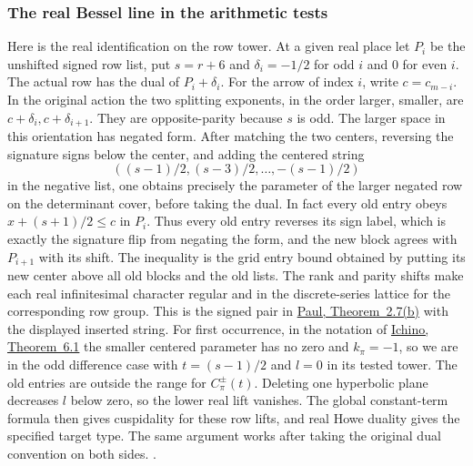 \subsubsection{The real Bessel line in the arithmetic tests}
Here is the real identification on the row tower. At a given
real place let \(P_i\) be the unshifted signed row list, put
\(s=r+6\) and
\(\delta_i=-1/2\) for odd \(i\) and \(0\) for even \(i\).
The actual row has the dual of \(P_i+\delta_i\).
For the arrow of index \(i\), write \(c=c_{m-i}\).
In the original action the two splitting exponents, in the
order larger, smaller, are \(c+\delta_i,c+\delta_{i+1}\).
They are opposite-parity because \(s\) is odd. The larger
space in this orientation has negated form. After matching
the two centers, reversing the signature signs below the
center, and adding the centered string
\[
 ((s-1)/2,(s-3)/2,\ldots,-(s-1)/2)
\]
in the negative list, one obtains precisely the parameter of
the larger negated row on the determinant cover, before
taking the dual. In fact every old entry obeys
\(x+(s+1)/2\le c\) in \(P_i\).
Thus every old entry reverses its sign label, which is exactly
the signature flip from negating the form, and the new block
agrees with \(P_{i+1}\) with its shift. The inequality is
the grid entry bound obtained by putting its new center above
all old blocks and the old lists. The rank and parity shifts
make each real infinitesimal character regular and in the
discrete-series lattice for the corresponding row group.
This is the signed pair in
\href{https://doi.org/10.4153/CJM-1999-029-6}{Paul, Theorem~2.7(b)}
with the displayed inserted string. For first occurrence, in
the notation of \href{https://arxiv.org/abs/2008.06174}{Ichino,
Theorem~6.1} the smaller centered parameter has no zero and
\(k_\pi=-1\), so we are in the odd difference case with
\(t=(s-1)/2\) and \(l=0\) in its tested tower. The old
entries are outside the range for \(C_\pi^\pm(t)\). Deleting
one hyperbolic plane decreases \(l\) below zero, so the
lower real lift vanishes. The global constant-term formula
then gives cuspidality for these row lifts, and real Howe
duality gives the specified target type. The same argument
works after taking the original dual convention on both
sides.
.

